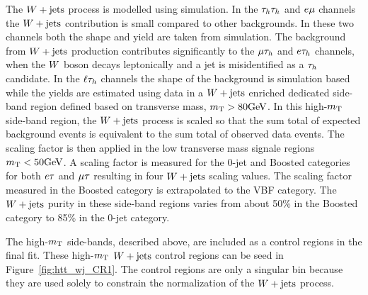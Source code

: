 The $W+\text{jets}$ process is modelled using simulation.
In the $\tau_{h}\tau_{h}$ and $e\mu$ channels the $W+\text{jets}$ contribution 
is small compared to other backgrounds. In these two channels both the shape and 
yield are taken from simulation.
The background from $W+\text{jets}$ production contributes significantly to the
$\mu\tau_{h}$ and $e\tau_{h}$ channels, when the $W$ boson decays leptonically and
a jet is misidentified as a $\tau_{h}$ candidate. In the $\ell\tau_{h}$ channels
the shape of the background is simulation based while the yields are estimated 
using data in a $W+\text{jets}$ enriched dedicated side-band region defined
based on transverse mass, $m_\mathrm{T} > 80\mathrm{GeV}$. In this high-$m_\mathrm{T}$ side-band region, the $W+\text{jets}$
process is scaled so that the sum total of expected background events is equivalent
to the sum total of observed data events. The scaling factor is then applied
in the low transverse mass signale regions $m_\mathrm{T} < 50\mathrm{GeV}$. A scaling factor
is measured for the 0-jet and Boosted categories for both $e\tau$ and $\mu\tau$ resulting
in four $W+\text{jets}$ scaling values. The scaling factor measured in the Boosted
category is extrapolated to the VBF category. The $W+\text{jets}$ purity in these
side-band regions varies from about 50\% in the Boosted category to 85\% in the 0-jet category.

The high-$m_\mathrm{T}$ side-bands, described above, are included as a control regions in the final fit.
These high-$m_\mathrm{T}$ $W+\text{jets}$ control regions can be seed in Figure~\ref{fig:htt_wj_CR1}.
The control regions are only a singular bin because they are used solely to constrain 
the normalization of the $W+\text{jets}$ process.

